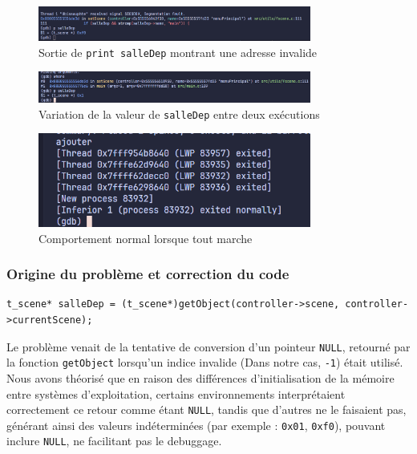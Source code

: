 \documentclass[a4paper,11pt]{article}
\begin{document}
\begin{figure}[ht]
\centering
\includegraphics[width=0.8\textwidth]{./img/gdb0xf0.png}
\caption{Sortie de \texttt{print salleDep} montrant une adresse invalide}
\label{fig:gdb0xf0}
\end{figure}

\begin{figure}[ht]
\centering
\includegraphics[width=0.8\textwidth]{./img/gdb0x1.png}
\caption{Variation de la valeur de \texttt{salleDep} entre deux exécutions}
\label{fig:gdb0x1}
\end{figure}

\begin{figure}[ht]
\centering
\includegraphics[width=0.8\textwidth]{./img/gdbNoError.png}
\caption{Comportement normal lorsque tout marche}
\label{fig:gdbNoError}
\end{figure}

\subsubsection{Origine du problème et correction du code}

\begin{lstlisting}[caption={Ligne fautive}, label=code:fautive]
t_scene* salleDep = (t_scene*)getObject(controller->scene, controller->currentScene);
\end{lstlisting}

Le problème venait de la tentative de conversion d'un pointeur \texttt{NULL}, retourné par la fonction \texttt{getObject} lorsqu'un indice invalide (Dans notre cas, \texttt{-1}) était utilisé.
Nous avons théorisé que en raison des différences d'initialisation de la mémoire entre systèmes d'exploitation, certains environnements interprétaient correctement ce retour comme étant \texttt{NULL}, tandis que d'autres ne le faisaient pas, générant ainsi des valeurs indéterminées (par exemple : \texttt{0x01}, \texttt{0xf0}), pouvant inclure \texttt{NULL}, ne facilitant pas le debuggage.
\end{document}
